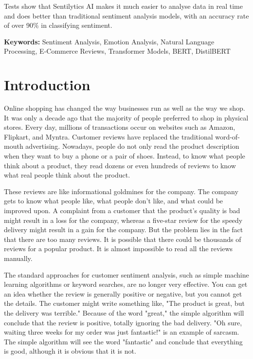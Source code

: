 \documentclass[11pt,a4paper]{article}
\begin{document}
Tests show that Sentilytics AI makes it much easier to analyse data in real time and does better than traditional sentiment analysis models, with an accuracy rate of over 90\% in classifying sentiment.

\textbf{Keywords:} Sentiment Analysis, Emotion Analysis, Natural Language Processing, E-Commerce Reviews, Transformer Models, BERT, DistilBERT

\section{Introduction}

Online shopping has changed the way businesses run as well as the way we shop. It was only a decade ago that the majority of people preferred to shop in physical stores. Every day, millions of transactions occur on websites such as Amazon, Flipkart, and Myntra. Customer reviews have replaced the traditional word-of-mouth advertising. Nowadays, people do not only read the product description when they want to buy a phone or a pair of shoes. Instead, to know what people think about a product, they read dozens or even hundreds of reviews to know what real people think about the product. 

These reviews are like informational goldmines for the company. The company gets to know what people like, what people don’t like, and what could be improved upon. A complaint from a customer that the product’s quality is bad might result in a loss for the company, whereas a five-star review for the speedy delivery might result in a gain for the company. But the problem lies in the fact that there are too many reviews. It is possible that there could be thousands of reviews for a popular product. It is almost impossible to read all the reviews manually.

The standard approaches for customer sentiment analysis, such as simple machine learning algorithms or keyword searches, are no longer very effective. You can get an idea whether the review is generally positive or negative, but you cannot get the details. The customer might write something like, "The product is great, but the delivery was terrible." Because of the word "great," the simple algorithm will conclude that the review is positive, totally ignoring the bad delivery. "Oh sure, waiting three weeks for my order was just fantastic!" is an example of sarcasm. The simple algorithm will see the word "fantastic" and conclude that everything is good, although it is obvious that it is not.
\end{document}
